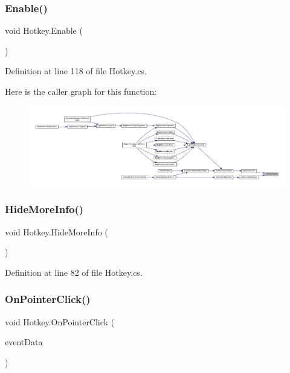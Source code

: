 \subsubsection{\texorpdfstring{Enable()}{Enable()}}
{\footnotesize\ttfamily void Hotkey.\+Enable (\begin{DoxyParamCaption}{ }\end{DoxyParamCaption})}



Definition at line 118 of file Hotkey.\+cs.

Here is the caller graph for this function\+:
\nopagebreak
\begin{figure}[H]
\begin{center}
\leavevmode
\includegraphics[width=350pt]{class_hotkey_ae078d4716dbd3a3c703a3ef341e56562_icgraph}
\end{center}
\end{figure}
\mbox{\label{class_hotkey_a9362ee088eb695642f30c3b8818d0b1a}} 
\subsubsection{\texorpdfstring{HideMoreInfo()}{HideMoreInfo()}}
{\footnotesize\ttfamily void Hotkey.\+Hide\+More\+Info (\begin{DoxyParamCaption}{ }\end{DoxyParamCaption})}



Definition at line 82 of file Hotkey.\+cs.

\mbox{\label{class_hotkey_a86ced9a614ad8d537fcab4738abcb0ef}} 
\subsubsection{\texorpdfstring{OnPointerClick()}{OnPointerClick()}}
{\footnotesize\ttfamily void Hotkey.\+On\+Pointer\+Click (\begin{DoxyParamCaption}\item[{Pointer\+Event\+Data}]{event\+Data }\end{DoxyParamCaption})}



